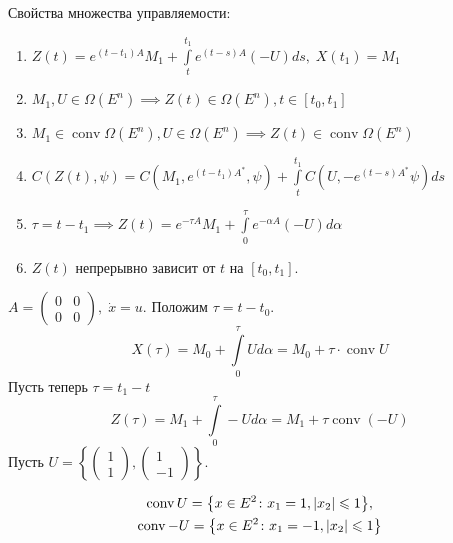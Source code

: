 Свойства множества управляемости:
\begin{enumerate}
    \item $Z(t) = e^{(t - t_1)A} M_1 + \displaystyle \int\limits_{t}^{t_1} e^{(t - s)A}(-U) ds, \; X(t_1) = M_1$
    \item $M_1, U \in \Omega(E^n) \implies Z(t) \in \Omega(E^n), t \in [t_0, t_1]$
    \item $M_1 \in \operatorname{conv}\Omega(E^n), U \in \Omega(E^n) \implies Z(t) \in \operatorname{conv} \Omega(E^n)$
    \item $C(Z(t), \psi) = C(M_1, e^{(t - t_1)A^*}, \psi) + \displaystyle \int\limits_{t}^{t_1} C(U, -e^{(t - s)A^*}\psi) ds$
    \item $\tau = t - t_1 \implies Z(t) = e^{-\tau A} M_1 + \displaystyle \int\limits_{0}^{\tau} e^{-\alpha A} (-U) d\alpha$
    \item $Z(t)$ непрерывно зависит от $t$ на $[t_0, t_1]$.
\end{enumerate}

\begin{exmp}
    $A = \left( \begin{matrix}
        0 & 0 \\
        0 & 0
    \end{matrix} \right), \; \dot{x} = u.$
    Положим $\tau = t - t_0$.
    \begin{equation*}
        X(\tau) = M_0 + \int\limits_{0}^{\tau} U d\alpha = M_0 + \tau \cdot \operatorname{conv} U
    \end{equation*}
    Пусть теперь $\tau = t_1 - t$
    \begin{equation*}
        Z(\tau) = M_1 + \int\limits_{0}^{\tau} -U d\alpha = M_1 + \tau \operatorname{conv} (-U)
    \end{equation*}
    Пусть $U = \left\{ \left( \begin{matrix}
        1 \\ 1
    \end{matrix} \right), 
    \left( \begin{matrix}
        1 \\ -1
    \end{matrix} \right) \right\}$.

    \begin{gather*}
        \operatorname{conv} U = \bigl\{ x \in E^2\colon x_1 = 1, |x_2| \leqslant 1 \bigr\}, \\
        \operatorname{conv} -U = \bigl\{ x \in E^2\colon x_1 = -1,  |x_2| \leqslant 1 \bigr\}
    \end{gather*}

\end{exmp}

